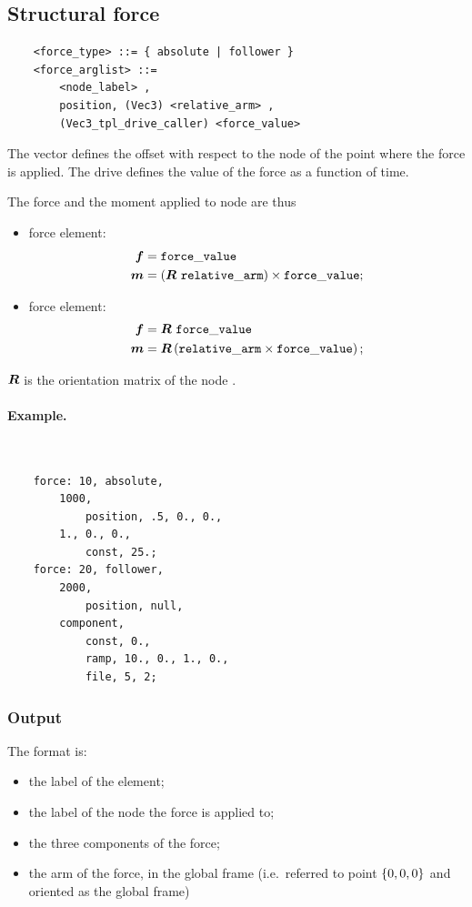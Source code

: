 \subsection{Structural force}
\begin{verbatim}
    <force_type> ::= { absolute | follower } 
    <force_arglist> ::=
        <node_label> , 
        position, (Vec3) <relative_arm> ,
        (Vec3_tpl_drive_caller) <force_value>
\end{verbatim}
The vector  defines the offset with respect
to the node of the point where the force is applied.
The drive  defines the value of the force
as a function of time.

The force and the moment applied to node  are thus
\begin{itemize}
\item {} force element:
\begin{subequations}
\begin{align}
	\boldsymbol{f} & = \mathtt{force\_value} \\
	\boldsymbol{m} & = \left( \boldsymbol{R} \ \mathtt{relative\_arm} \right) \times \mathtt{force\_value} ;
\end{align}
\end{subequations}

\item {} force element:
\begin{subequations}
\begin{align}
	\boldsymbol{f} & = \boldsymbol{R} \ \mathtt{force\_value} \\
	\boldsymbol{m} & = \boldsymbol{R} \left( \mathtt{relative\_arm} \times \mathtt{force\_value} \right) ;
\end{align}
\end{subequations}
\end{itemize}
$\boldsymbol{R}$ is the orientation matrix of the node .

\paragraph{Example.} \
\begin{verbatim}
    force: 10, absolute,
        1000,
            position, .5, 0., 0.,
        1., 0., 0.,
            const, 25.;
    force: 20, follower,
        2000,
            position, null,
        component,
            const, 0.,
            ramp, 10., 0., 1., 0.,
            file, 5, 2;
\end{verbatim}

\subsubsection{Output}
The format is:
\begin{itemize}
    \item the label of the element;
    \item the label of the node the force is applied to;
    \item the three components of the force;
    \item the arm of the force, in the global frame (i.e.\ referred
          to point $ \left\{ 0,0,0 \right\} $ and oriented as the global frame)
\end{itemize}

